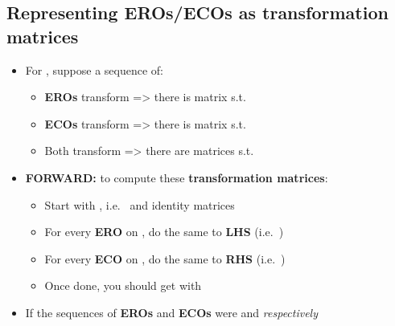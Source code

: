 \subsection*{Representing EROs/ECOs as transformation
  matrices}

\begin{itemize}

  \item
        For , suppose a sequence of:

        \begin{itemize}

          \item
                \textbf{EROs} transform
                 =\textgreater{}
                there is matrix  s.t. 
          \item
                \textbf{ECOs} transform
                 =\textgreater{}
                there is matrix  s.t. 
          \item
                Both transform
                =\textgreater{} there are matrices  s.t. 
        \end{itemize}
  \item
        \textbf{FORWARD:} to compute these \textbf{transformation matrices}:

        \begin{itemize}

          \item
                Start with \iMbox{[I_{m} \ | \ A \ | \ I_{n}]}, i.e.~ and
                identity matrices
          \item
                For every \textbf{ERO} on , do the same to \textbf{LHS}
                (i.e.~)
          \item
                For every \textbf{ECO} on , do the same to \textbf{RHS}
                (i.e.~)
          \item
                Once done, you should get
                \iMbox{\ds [I_{m} \ | \ A \ | \ I_{n}] \rightsquigarrow [R \ | \ A' \ | \ C]}
                with 
        \end{itemize}
  \item
        If the sequences of \textbf{EROs} and \textbf{ECOs} were
         and
         \emph{respectively}


\end{itemize}

